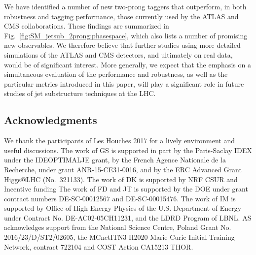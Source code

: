 We have identified a  number of new two-prong taggers that outperform, in both robustness and tagging performance, those currently used by the ATLAS and CMS collaborations.
%
These findings are summarized in Fig.~\ref{fig:SM_jetsub_2prong:phasespace}, which also lists a number of promising new observables.
%
We therefore believe that further studies using more detailed simulations of the ATLAS and CMS detectors, and ultimately on real data, would be of significant interest.
%
More generally, we expect that the emphasis on a simultaneous evaluation of the performance and robustness, as well as the particular metrics introduced in this paper, will play a significant role in future studies of jet substructure techniques at the LHC.

\subsection*{Acknowledgments}

We thank the participants of Les Houches 2017 for a lively environment and useful discussions.
%
The work of GS is supported in part by the Paris-Saclay IDEX under the
IDEOPTIMALJE grant, by the French Agence Nationale de la Recherche,
under grant ANR-15-CE31-0016, and by the ERC Advanced Grant Higgs@LHC
(No.\ 321133).
%
The work of DK is supported by NRF CSUR and Incentive funding
%
The work of FD and JT is supported by the DOE under grant contract numbers DE-SC-00012567 and DE-SC-00015476.
%
The work of IM is supported by Office of High Energy Physics of the U.S. Department of Energy under Contract No. DE-AC02-05CH11231, and the LDRD Program of LBNL.
%
AS acknowledges support from the National Science Centre, Poland Grant No. 2016/23/D/ST2/02605, the MCnetITN3 H2020 Marie Curie Initial Training Network, contract 722104 and COST Action CA15213 THOR.




%

%
